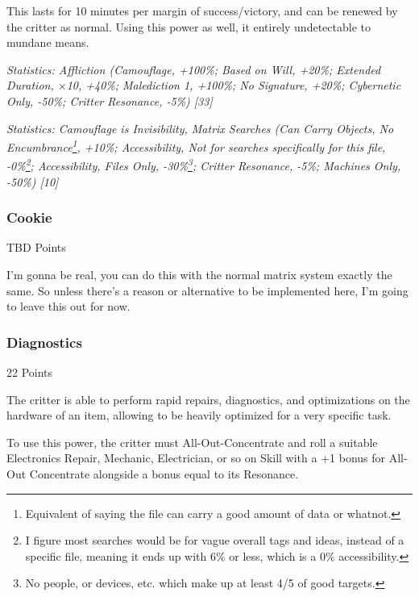 \begin{multicols*}{3}
	This lasts for 10 minutes per margin of success/victory, and can be renewed by the critter as normal. Using this power as well, it entirely undetectable to mundane means.

	\textcolor{OliveGreen}{\textit{Statistics: Affliction (Camouflage, +100\%; Based on Will, +20\%; Extended Duration, $\times$10, +40\%; Malediction 1, +100\%; No Signature, +20\%; Cybernetic Only, -50\%; Critter Resonance, -5\%) [33]}}
	
	\textcolor{OliveGreen}{\textit{Statistics: Camouflage is Invisibility, Matrix Searches (Can Carry Objects, No Encumbrance\footnote{Equivalent of saying the file can carry a good amount of data or whatnot.}, +10\%; Accessibility, Not for searches specifically for this file, -0\%\footnote{I figure most searches would be for vague overall tags and ideas, instead of a specific file, meaning it ends up with 6\% or less, which is a 0\% accessibility.}; Accessibility, Files Only, -30\%\footnote{No people, or devices, etc. which make up at least 4/5 of good targets.}; Critter Resonance, -5\%; Machines Only, -50\%) [10] }}
	 
	\subsubsection{Cookie}\label{cookie}
	\begin{flushright}
		TBD Points
	\end{flushright}

	I'm gonna be real, you can do this with the normal matrix system exactly the same. So unless there's a reason or alternative to be implemented here, I'm going to leave this out for now.

	\subsubsection{Diagnostics}\label{diagnostics}
	\begin{flushright}
		22 Points
	\end{flushright}

	The critter is able to perform rapid repairs, diagnostics, and optimizations on the hardware of an item, allowing to be heavily optimized for a very specific task.
	
	To use this power, the critter must All-Out-Concentrate and roll a suitable Electronics Repair, Mechanic, Electrician, or so on Skill with a +1 bonus for All-Out Concentrate alongside a bonus equal to its Resonance. 
	

\end{multicols*}
